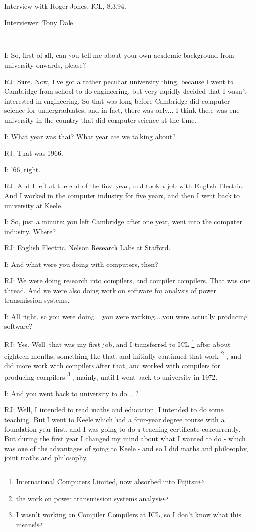 \documentclass[10pt,titlepage]{book}
\begin{document}
\ 

Interview with Roger Jones, ICL, 8.3.94.

Interviewer: Tony Dale 

\ 

I: So, first of all, can you tell me about your own academic background from university onwards, please?

RJ: Sure. Now, I've got a rather peculiar university thing, because I went to Cambridge from school to do engineering, but very rapidly decided that I wasn't interested in engineering. So that was long before Cambridge did computer science for undergraduates, and in fact, there was only... I think there was one university in the country that did computer science at the time.

I: What year was that? What year are we talking about?

RJ: That was 1966.

I: '66, right.

RJ: And I left at the end of the first year, and took a job with English Electric. And I worked in the computer industry for five years, and then I went back to university at Keele.

I: So, just a minute: you left Cambridge after one year, went into the computer industry. Where?

RJ: English Electric. Nelson Research Labs at Stafford.

I: And what were you doing with computers, then?

RJ: We were doing research into compilers, and compiler compilers. That was one thread. And we were also doing work on software for analysis of power transmission systems.

I: All right, so you were doing... you were working... you were actually producing software?

RJ: Yes. Well, that was my first job, and I transferred to ICL%
\footnote{
International Computers Limited, now absorbed into Fujitsu}%
after about eighteen months, something like that, and initially continued that work%
\footnote{
the work on power transmission systems analysis}%
, and did more work with compilers after that, and worked with compilers for producing compilers%
\footnote{
I wasn't working on Compiler Compilers at ICL, so I don't know what this means!}%
, mainly, until I went back to university in 1972.

I: And you went back to university to do... ?

RJ: Well, I intended to read maths and education.
I intended to do some teaching.
But I went to Keele which had a four-year degree course with a foundation year first, and I was going to do a teaching certificate concurrently.
But during the first year I changed my mind about what I wanted to do - which was one of the advantages of going to Keele - and so I did maths and philosophy, joint maths and philosophy.
\end{document}
